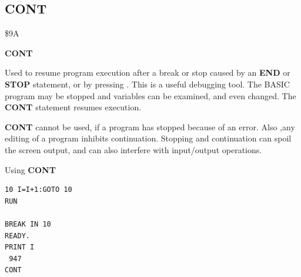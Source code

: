 \subsection{CONT}
\begin{description}[leftmargin=2cm,style=nextline]
\item [Token:] \$9A
\item [Format:] {\bf CONT}
\item [Usage:] Used to resume
               program execution after a break or stop caused by
               an {\bf END} or {\bf STOP} statement, or by pressing
               .
               This is a useful debugging tool. The BASIC program may be stopped
               and variables can be examined, and even changed.
               The {\bf CONT} statement resumes execution.
\item [Remarks:] {\bf CONT} cannot be used, if a program has stopped because
               of an error. Also ,any editing of a program
               inhibits continuation. Stopping and continuation
               can spoil the screen output, and can also interfere with
               input/output operations.
\item [Example:] Using {\bf CONT}
\begin{tcolorbox}[colback=black,coltext=white]
\verbatimfont{\codefont}
\begin{verbatim}
10 I=I+1:GOTO 10
RUN

BREAK IN 10
READY.
PRINT I
 947
CONT
\end{verbatim}
\end{tcolorbox}
\end{description}


\newpage

